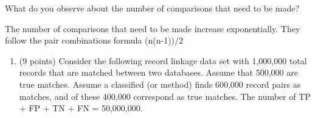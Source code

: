 \documentclass[
]{article}
\providecommand{\tightlist}{%
  \setlength{\itemsep}{0pt}\setlength{\parskip}{0pt}}
\begin{document}
What do you observe about the number of comparisons that need to be
made?

The number of comparisons that need to be made increase exponentially.
They follow the pair combinations formula (n(n-1))/2

\begin{enumerate}
\def\labelenumi{\arabic{enumi}.}
\setcounter{enumi}{2}
\tightlist
\item
  (9 points) Consider the following record linkage data set with
  1,000,000 total records that are matched between two databases. Assume
  that 500,000 are true matches. Assume a classified (or method) finds
  600,000 record pairs as matches, and of these 400,000 correspond as
  true matches. The number of TP + FP + TN + FN = 50,000,000.
\end{enumerate}
\end{document}
